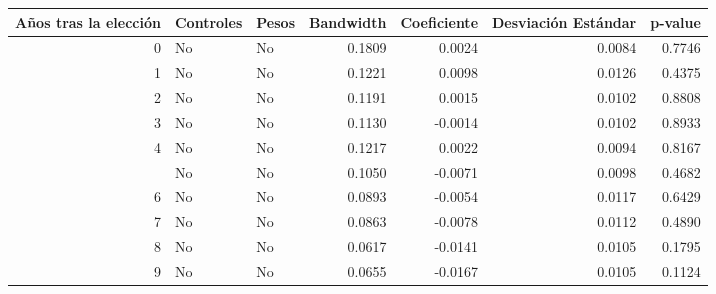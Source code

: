 
\begin{tabular}{rllrrrr}
\toprule
Años tras la elección & Controles & Pesos & Bandwidth & Coeficiente & Desviación Estándar & p-value\\
\midrule
0 & No & No & 0.1809 & 0.0024 & 0.0084 & 0.7746\\
1 & No & No & 0.1221 & 0.0098 & 0.0126 & 0.4375\\
2 & No & No & 0.1191 & 0.0015 & 0.0102 & 0.8808\\
3 & No & No & 0.1130 & -0.0014 & 0.0102 & 0.8933\\
4 & No & No & 0.1217 & 0.0022 & 0.0094 & 0.8167\\
\addlinespace
5 & No & No & 0.1050 & -0.0071 & 0.0098 & 0.4682\\
6 & No & No & 0.0893 & -0.0054 & 0.0117 & 0.6429\\
7 & No & No & 0.0863 & -0.0078 & 0.0112 & 0.4890\\
8 & No & No & 0.0617 & -0.0141 & 0.0105 & 0.1795\\
9 & No & No & 0.0655 & -0.0167 & 0.0105 & 0.1124\\
\bottomrule
\end{tabular}